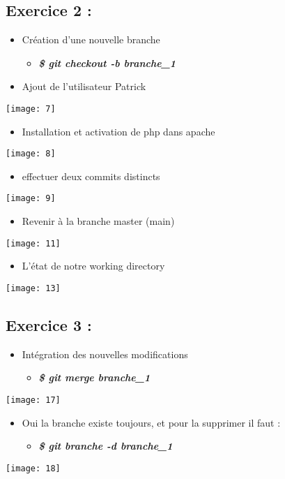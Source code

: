 \documentclass[a4paper]{article}
\begin{document}
	\subsection{Exercice 2 :}
	\begin{itemize}
		\item Création d'une nouvelle branche
		\begin{itemize}
			\item \textbf{\textit{\$ git checkout -b branche\_1}}
		\end{itemize}
		\item Ajout de l'utilisateur Patrick
	\end{itemize}
	\texttt{[image: 7]}
	
	\begin{itemize}
		\item Installation et activation de php dans apache
	\end{itemize}
	\texttt{[image: 8]}
	\begin{itemize}
		\item effectuer deux commits distincts
	\end{itemize}
	\texttt{[image: 9]}
	\begin{itemize}
		\item Revenir à la branche master (main)
	\end{itemize}
	\texttt{[image: 11]}
	
	\begin{itemize}
		\item L'état de notre working directory
	\end{itemize}
	\texttt{[image: 13]}
	
	\subsection{Exercice 3 :}
	\begin{itemize}
		\item Intégration des nouvelles modifications
		\begin{itemize}
			\item \textbf{\textit{\$ git merge branche\_1}}
		\end{itemize}
	\end{itemize}
	\texttt{[image: 17]}
	
	\begin{itemize}
		\item Oui la branche existe toujours, et pour la supprimer il faut :
		\begin{itemize}
			\item \textbf{\textit{\$ git branche -d branche\_1}}
		\end{itemize}
	\end{itemize}
	\texttt{[image: 18]}
	
\end{document}

